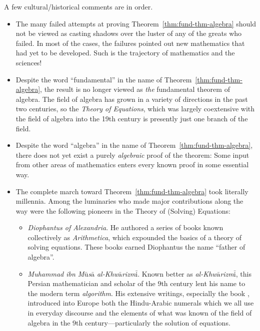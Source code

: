 A few cultural/historical comments are in order.
\begin{itemize}
\item
The many failed attempts at proving Theorem~\ref{thm:fund-thm-algebra} should not be viewed as casting shadows over the luster of any of the greats who failed.  In most of the cases, the failures pointed out new mathematics that had yet to be developed.  Such is the trajectory of mathematics and the sciences!
\medskip\item
Despite the word ``fundamental'' in the name of Theorem~\ref{thm:fund-thm-algebra}, the result is no longer viewed as {\em the} fundamental theorem of algebra.  The field of algebra has grown in a variety of directions in the past two centuries, so the {\em Theory of Equations}, which was largely coextensive with the field of algebra into the 19th century is presently just one branch of the field.
\medskip\item
Despite the word ``algebra'' in the name of Theorem~\ref{thm:fund-thm-algebra}, there does not yet exist a purely {\em algebraic} proof of the theorem: Some input from other areas of mathematics enters every known proof in some essential way.
\medskip\item
The complete march toward Theorem~\ref{thm:fund-thm-algebra} took literally millennia.  Among the luminaries who made major contributions along the way were the following pioneers in the Theory of (Solving) Equations:
  \begin{itemize}
  \item
{\it Diophantus of Alexandria}.  He authored a series of books known collectively as {\it Arithmetica}, which expounded the basics of a theory of solving equations.  These books earned Diophantus the name ``father of algebra''.
   \medskip\item
{\it Muhammad ibn M$\bar{\mbox{u}}$s$\bar{\mbox{a}}$ al-Khw$\bar{\mbox{a}}$rizm$\bar{\mbox{i}}$}.  Known better as {\em al-Khw$\bar{\mbox{a}}$rizm$\bar{\mbox{i}}$}, this Persian mathematician and scholar of the $9$th century lent his name to the modern term {\it algorithm}.  His extensive writings, especially the book \cite{Al-Khwarizmi}, introduced into Europe both the Hindu-Arabic numerals which we all use in everyday discourse and the elements of what was known of the field of algebra in the $9$th century---particularly the solution of equations.

\medskip

\end{itemize}
\end{itemize}
